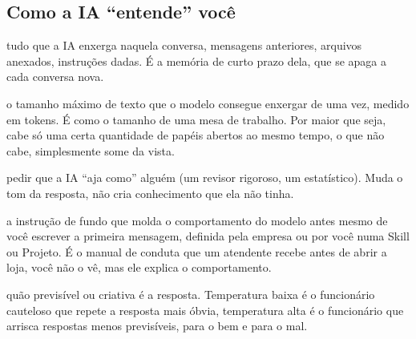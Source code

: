 \documentclass[11pt,a4paper]{article}
\begin{document}
\subsection*{Como a IA ``entende'' você}
\begin{description}[style=nextline,leftmargin=0pt,itemsep=6pt]
  \item[\poppinsmed\color{azulUNI}Contexto] tudo que a IA enxerga naquela conversa, mensagens anteriores, arquivos anexados, instruções dadas. É a memória de curto prazo dela, que se apaga a cada conversa nova.
  \item[\poppinsmed\color{azulUNI}Janela de contexto] o tamanho máximo de texto que o modelo consegue enxergar de uma vez, medido em tokens. É como o tamanho de uma mesa de trabalho. Por maior que seja, cabe só uma certa quantidade de papéis abertos ao mesmo tempo, o que não cabe, simplesmente some da vista.
  \item[\poppinsmed\color{azulUNI}Papel/persona] pedir que a IA ``aja como'' alguém (um revisor rigoroso, um estatístico). Muda o tom da resposta, não cria conhecimento que ela não tinha.
  \item[\poppinsmed\color{azulUNI}System prompt] a instrução de fundo que molda o comportamento do modelo antes mesmo de você escrever a primeira mensagem, definida pela empresa ou por você numa Skill ou Projeto. É o manual de conduta que um atendente recebe antes de abrir a loja, você não o vê, mas ele explica o comportamento.
  \item[\poppinsmed\color{azulUNI}Temperatura] quão previsível ou criativa é a resposta. Temperatura baixa é o funcionário cauteloso que repete a resposta mais óbvia, temperatura alta é o funcionário que arrisca respostas menos previsíveis, para o bem e para o mal.
\end{description}
\end{document}
